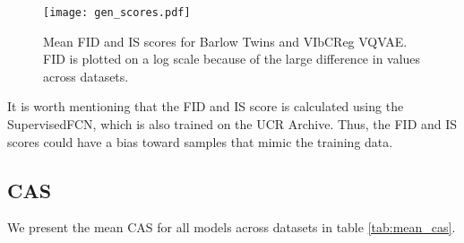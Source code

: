 \documentclass[../../thesis.tex]{subfiles}
\begin{document}
\begin{figure}[H]
    \texttt{[image: gen\_scores.pdf]}
    \centering  
    \caption{Mean FID and IS scores for Barlow Twins and VIbCReg VQVAE. FID is plotted on a log scale because of the large difference in values across datasets.}
    \label{fig:mean_gen_scores}
\end{figure}

It is worth mentioning that the FID and IS score is calculated using the SupervisedFCN, which is also trained on the UCR Archive. Thus, the FID and IS scores could have a bias toward samples that mimic the training data. 


\subsection{CAS}

We present the mean CAS for all models across datasets in table \ref{tab:mean_cas}.
\end{document}
